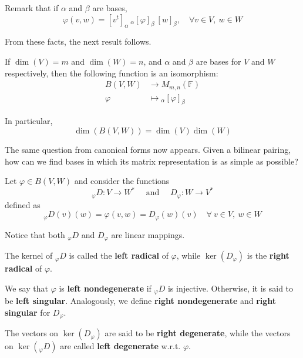 Remark that if $\alpha$ and $\beta$ are bases,
\[
  \varphi(v,w) = [v^t]_\alpha ~{}_\alpha [\varphi]_\beta ~[w]_\beta, \quad \forall v \in V, ~w \in W
\]

From these facts, the next result follows.

\begin{theorem}
  If $\dim(V) = m$ and $\dim(W) = n$, and $\alpha$ and $\beta$ are bases for $V$ and $W$ respectively, then the following function is an isomorphism: 
  \begin{equation*}
    \begin{aligned}
      B(V,W) &\longrightarrow M_{m,n}(\mathbb{F})\\
      \varphi &\longmapsto {}_\alpha [\varphi]_\beta
    \end{aligned}
  \end{equation*}

  In particular,
  \[
    \dim(B(V,W)) = \dim(V) \dim(W)
  \]
\end{theorem}

The same question from canonical forms now appears. Given a bilinear pairing, how can we find bases in which its matrix representation is as simple as possible?

\begin{definition}[Radical]
Let $\varphi \in B(V,W)$ and consider the functions 
\[
  {}_\varphi D: V \longrightarrow W^\ast \quad \text{ and } \quad D_\varphi : W \longrightarrow V^\ast
\]
defined as 
\[
  {}_\varphi D(v)(w) = \varphi(v,w) = D_\varphi(w)(v) \quad \forall~ v \in V, ~w \in W
\]

Notice that both ${}_\varphi D$ and $D_\varphi$ are linear mappings. 

The kernel of ${}_\varphi D$ is called the \textbf{left radical} of $\varphi$, while $\ker(D_\varphi)$ is the \textbf{right radical} of $\varphi$.
\end{definition}

\begin{definition}
We say that $\varphi$ is \textbf{left nondegenerate} if ${}_\varphi D$ is injective. Otherwise, it is said to be \textbf{left singular}. Analogously, we define \textbf{right nondegenerate} and \textbf{right singular} for $D_\varphi$.

The vectors on $\ker(D_\varphi)$ are said to be \textbf{right degenerate}, while the vectors on $\ker({}_\varphi D)$ are called \textbf{left degenerate} w.r.t. $\varphi$. 
\end{definition}

